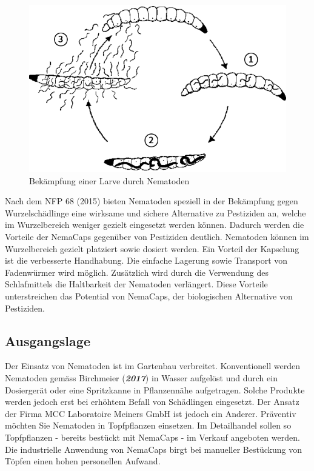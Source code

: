 \begin{figure}[H]
	\includegraphics[width=1\textwidth]{Illustrationen/3-Einleitung/zyklus_nematoden.png}
	\caption{Bekämpfung einer Larve durch Nematoden}
	\label{fig:zyklus_Nematoden}
\end{figure}
	
Nach dem NFP 68 (2015) bieten Nematoden speziell in der Bekämpfung gegen Wurzelschädlinge eine wirksame und sichere Alternative zu Pestiziden an, welche im Wurzelbereich weniger gezielt eingesetzt werden können. Dadurch werden die Vorteile der NemaCaps gegenüber von Pestiziden deutlich. Nematoden können im Wurzelbereich gezielt platziert sowie dosiert werden. Ein Vorteil der Kapselung ist die verbesserte Handhabung. Die einfache Lagerung sowie Transport von Fadenwürmer wird möglich.  Zusätzlich wird durch die Verwendung des Schlafmittels die Haltbarkeit der Nematoden verlängert. Diese Vorteile unterstreichen das Potential von NemaCaps, der biologischen Alternative von Pestiziden.

\subsection{Ausgangslage}
Der Einsatz von Nematoden ist im Gartenbau verbreitet. Konventionell werden Nematoden gemäss Birchmeier (\textbf{\textit{2017}}) in Wasser aufgelöst und durch ein Dosiergerät oder eine Spritzkanne in Pflanzennähe aufgetragen. Solche Produkte werden jedoch erst bei erhöhtem Befall von Schädlingen eingesetzt. Der Ansatz der Firma MCC Laboratoire Meiners GmbH ist jedoch ein Anderer. Präventiv möchten Sie Nematoden in Topfpflanzen einsetzen. Im Detailhandel sollen so Topfpflanzen - bereits bestückt mit NemaCaps - im Verkauf angeboten werden.
\newline
Die industrielle Anwendung von NemaCaps birgt bei manueller Bestückung von Töpfen einen hohen personellen Aufwand. 